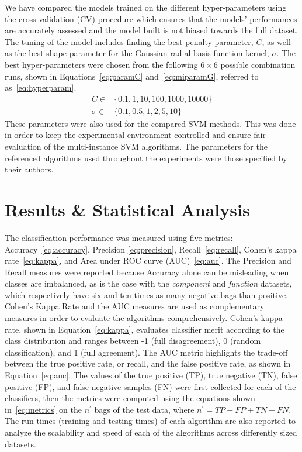 \documentclass[reqno]{vcuthesis}
\numberwithin{equation}{chapter}
\begin{document}
We have compared the models trained on the different hyper-parameters using the cross-validation (CV) procedure which ensures that the models’ performances are accurately assessed and the model built is not biased towards the full dataset. The tuning of the model includes finding the best penalty parameter, $C$, as well as the best shape parameter for the Gaussian radial basis function kernel, $\sigma$. The best hyper-parameters were chosen from the following $6 \times 6$ possible combination runs, shown in Equations~\eqref{eq:paramC} and~\eqref{eq:miparamG}, referred to as~\eqref{eq:hyperparam}. 
\begin{subequations}
\label{eq:hyperparam}
\begin{align}
C \in  & \{0.1, 1, 10, 100, 1000, 10000\} \label{eq:paramC}\\
\sigma \in  & \{0.1, 0.5, 1, 2, 5, 10\} \label{eq:miparamG}
\end{align}
\end{subequations}
These parameters were also used for the compared SVM methods. This was done in order to keep the experimental environment controlled and ensure fair evaluation of the multi-instance SVM algorithms. The parameters for the referenced algorithms used throughout the experiments were those specified by their authors.

\section{Results \& Statistical Analysis}
The classification performance was measured using five metrics: Accuracy~\eqref{eq:accuracy}, Precision \eqref{eq:precision}, Recall~\eqref{eq:recall}, Cohen's kappa rate~\eqref{eq:kappa}, and Area under ROC curve (AUC)~\eqref{eq:auc}. The Precision and Recall measures were reported because Accuracy alone can be misleading when classes are imbalanced, as is the case with the \textit{component} and \textit{function} datasets, which respectively have six and ten times as many negative bags than positive. Cohen's Kappa Rate and the AUC measures are used as complementary measures in order to evaluate the algorithms comprehensively. Cohen's kappa rate, shown in Equation~\eqref{eq:kappa}, evaluates classifier merit according to the class distribution and ranges between -1 (full disagreement), 0 (random classification), and 1 (full agreement). The AUC metric highlights the trade-off between the true positive rate, or recall, and the false positive rate, as shown in Equation~\eqref{eq:auc}. The values of the true positive (TP), true negative (TN), false positive (FP), and false negative samples (FN) were first collected for each of the classifiers, then the metrics were computed using the equations shown in~\eqref{eq:metrics} on the $n^\prime$ bags of the test data, where $n^\prime = TP + FP + TN + FN$. The run times (training and testing times) of each algorithm are also reported to analyze the scalability and speed of each of the algorithms across differently sized datasets. 
\end{document}
